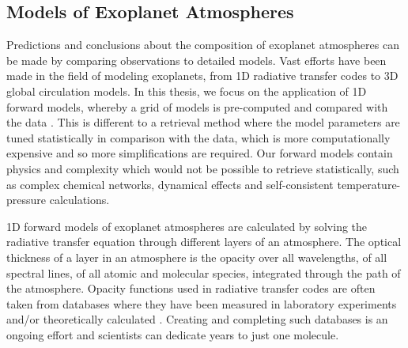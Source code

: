 
\subsection{Models of Exoplanet Atmospheres}%

Predictions and conclusions about the composition of exoplanet atmospheres can be made by comparing observations to detailed models. Vast efforts have been made in the field of modeling exoplanets, from 1D radiative transfer codes to 3D global circulation models. In this thesis, we focus on the application of 1D forward models, whereby a grid of models is pre-computed and compared with the data \citep{Zhang2019, Tsai2017, Piskorz2018, Line2013a}. This is different to a retrieval method where the model parameters are tuned statistically in comparison with the data, which is more computationally expensive and so more simplifications are required. Our forward models contain physics and complexity which would not be possible to retrieve statistically, such as complex chemical networks, dynamical effects and self-consistent temperature-pressure calculations.

1D forward models of exoplanet atmospheres are calculated by solving the radiative transfer equation through different layers of an atmosphere. The optical thickness of a layer in an atmosphere is the opacity over all wavelengths, of all spectral lines, of all atomic and molecular species, integrated through the path of the atmosphere. Opacity functions used in radiative transfer codes are often taken from databases where they have been measured in laboratory experiments and/or theoretically calculated \citep[e.g., HITRAN, ExoMol][]{Rothman2010, Freedman2008, Freedman2014}. Creating and completing such databases is an ongoing effort and scientists can dedicate years to just one molecule.


